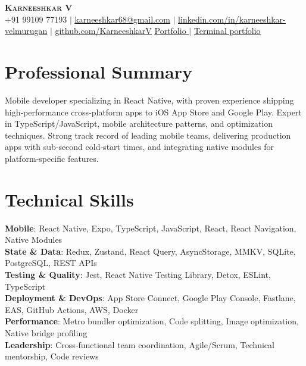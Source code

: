 \documentclass[letterpaper,11pt]{article}
\begin{document}
\begin{center}
  \textbf{\Huge \scshape Karneeshkar V} \\ \vspace{1pt}
  \small +91 99109 77193 $|$ 
  \href{mailto:karneeshkar68@gmail.com}{\underline{karneeshkar68@gmail.com}} $|$
  \href{https://www.linkedin.com/in/karneeshkar-velmurugan/}{\underline{linkedin.com/in/karneeshkar-velmurugan}} $|$
  \href{https://github.com/KarneeshkarV}{\underline{github.com/KarneeshkarV}} 
\newline \newline
\href{https://karneeshkar.tech/}{\underline{Portfolio}  }$|$
\href{https://www.karneeshkar.tech/#terminal}{\underline{Terminal portfolio}}
\end{center}

\section{Professional Summary}
Mobile developer specializing in React Native, with proven experience shipping high‑performance cross‑platform apps to iOS App Store and Google Play. Expert in TypeScript/JavaScript, mobile architecture patterns, and optimization techniques. Strong track record of leading mobile teams, delivering production apps with sub‑second cold‑start times, and integrating native modules for platform‑specific features.

\section{Technical Skills}
\begin{itemize}[leftmargin=0.15in, label={}]
  \small{\item{
    \textbf{Mobile}{: React Native, Expo, TypeScript, JavaScript, React, React Navigation, Native Modules} \\
    \textbf{State \& Data}{: Redux, Zustand, React Query, AsyncStorage, MMKV, SQLite, PostgreSQL, REST APIs} \\
    \textbf{Testing \& Quality}{: Jest, React Native Testing Library, Detox, ESLint, TypeScript} \\
    \textbf{Deployment \& DevOps}{: App Store Connect, Google Play Console, Fastlane, EAS, GitHub Actions, AWS, Docker}\\
    \textbf{Performance}{: Metro bundler optimization, Code splitting, Image optimization, Native bridge profiling}\\
              \textbf{Leadership}{: Cross‑functional team coordination, Agile/Scrum, Technical mentorship, Code reviews}}}
\end{itemize}
\end{document}
